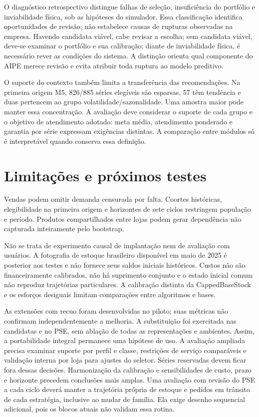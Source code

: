 \documentclass[preprint,12pt]{elsarticle}
\begin{document}
O diagnóstico retrospectivo distingue falhas de seleção, insuficiência do portfólio e inviabilidade física, sob as hipóteses do simulador. Essa classificação identifica oportunidades de revisão; não estabelece causas de rupturas observadas na empresa. Havendo candidata viável, cabe revisar a escolha; sem candidata viável, deve-se examinar o portfólio e sua calibração; diante de inviabilidade física, é necessário rever as condições do sistema. A distinção orienta qual componente do AIPE merece revisão e evita atribuir toda ruptura ao modelo preditivo.

O suporte do contexto também limita a transferência das recomendações. Na primeira origem M5, 826/885 séries elegíveis são esparsas, 57 têm tendência e duas pertencem ao grupo volatilidade/sazonalidade. Uma amostra maior pode manter essa concentração. A avaliação deve considerar o suporte de cada grupo e o objetivo de atendimento adotado: meta média, atendimento ponderado e garantia por série expressam exigências distintas. A comparação entre módulos só é interpretável quando conserva essa definição.

\section{Limitações e próximos testes}
Vendas podem omitir demanda censurada por falta. Coortes históricas, elegibilidade na primeira origem e horizontes de sete ciclos restringem população e período. Produtos compartilhados entre lojas podem gerar dependência não capturada inteiramente pelo bootstrap.

Não se trata de experimento causal de implantação nem de avaliação com usuários. A fotografia de estoque brasileiro disponível em maio de 2025 é posterior aos testes e não fornece seus saldos iniciais históricos. Custos não são financeiramente calibrados, não há suprimento conjunto e o estado inicial comum não reproduz trajetórias particulares. A calibração distinta da CappedBaseStock e os esforços desiguais limitam comparações entre algoritmos e bases.

As extensões com recuo foram desenvolvidas no piloto; suas métricas não confirmam independentemente a melhoria. A substituição foi exercitada nas candidatas e no PSE, sem ablação de todas as representações e ambientes. Assim, a portabilidade integral permanece uma hipótese de uso. A avaliação ampliada precisa examinar suporte por perfil e classe, restrições de serviço comparáveis e validação interna por loja para ajustes do seletor. Séries reservadas devem ficar fora dessas decisões. Harmonização da calibração e sensibilidades de custo, prazo e horizonte precedem conclusões mais amplas. Uma avaliação com revisão do PSE a cada ciclo deverá manter a trajetória própria de estoque e pedidos em trânsito de cada estratégia, inclusive ao mudar de família. Ela exige desenho sequencial adicional, pois os blocos atuais não validam essa rotina.
\end{document}
